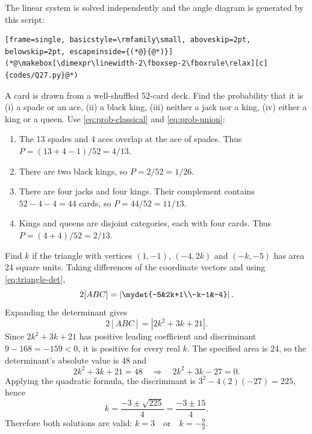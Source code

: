 \begin{enumerate}[label={},leftmargin=0pt,itemsep=9pt]
The linear system is solved independently and the angle diagram is generated by this script:
\begin{lstlisting}[frame=single, basicstyle=\rmfamily\small, aboveskip=2pt, belowskip=2pt, escapeinside={(*@}{@*)}]
(*@\makebox[\dimexpr\linewidth-2\fboxsep-2\fboxrule\relax][c]{codes/Q27.py}@*)
\end{lstlisting}
\setcounter{qcurrent}{28}\setcounter{equation}{0}
 A card is drawn from a well-shuffled 52-card deck. Find the probability that it is (i) a spade or an ace, (ii) a black king, (iii) neither a jack nor a king, (iv) either a king or a queen.
\solution Use \eqref{eq:prob-classical} and \eqref{eq:prob-union}:
\begin{enumerate}[label=(\roman*)]
\item The 13 spades and 4 aces overlap at the ace of spades. Thus $P=(13+4-1)/52=\boxed{4/13}$.
\item There are two black kings, so $P=2/52=\boxed{1/26}$.
\item There are four jacks and four kings. Their complement contains $52-4-4=44$ cards, so $P=44/52=\boxed{11/13}$.
\item Kings and queens are disjoint categories, each with four cards. Thus $P=(4+4)/52=\boxed{2/13}$.
\end{enumerate}

\setcounter{qcurrent}{29}\setcounter{equation}{0}
 Find $k$ if the triangle with vertices $(1,-1)$, $(-4,2k)$ and $(-k,-5)$ has area 24 square units.
\solution Taking differences of the coordinate vectors and using \eqref{eq:triangle-det},
\begin{equation}
2[ABC]=\left|\mydet{-5&2k+1\\-k-1&-4}\right|.
\end{equation}
Expanding the determinant gives
\begin{equation}
2[ABC]=|2k^2+3k+21|.
\end{equation}
Since $2k^2+3k+21$ has positive leading coefficient and discriminant $9-168=-159<0$, it is positive for every real $k$. The specified area is 24, so the determinant's absolute value is 48 and
\begin{equation}
2k^2+3k+21=48\quad\Longrightarrow\quad2k^2+3k-27=0.
\end{equation}
Applying the quadratic formula, the discriminant is $3^2-4(2)(-27)=225$, hence
\begin{equation}
k=\frac{-3\pm\sqrt{225}}4=\frac{-3\pm15}4.
\end{equation}
Therefore both solutions are valid: $\boxed{k=3\quad\text{or}\quad k=-\frac92}$.




\end{enumerate}
